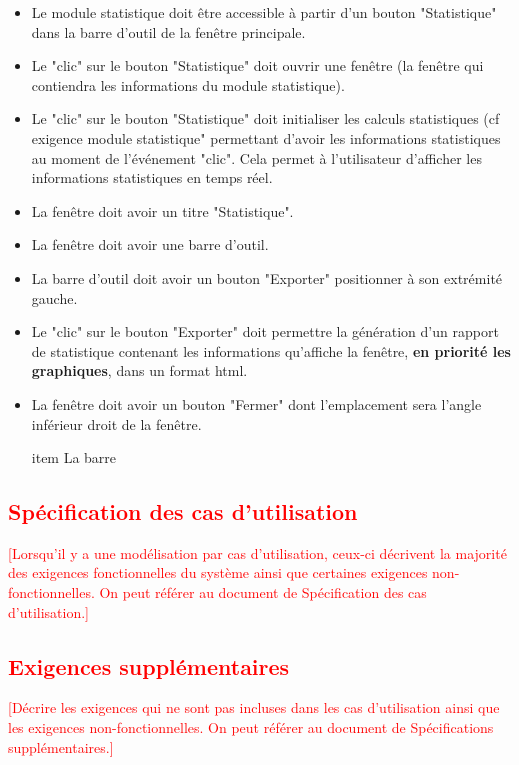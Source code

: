 \documentclass[10pt,a4paper]{report}
\begin{document}
		\begin{itemize}[label = $\triangleright$]

			\item Le module statistique doit être accessible à partir d'un bouton "Statistique" dans la barre d'outil de la fenêtre principale.

			\item Le "clic" sur le bouton "Statistique" doit ouvrir une fenêtre (la fenêtre qui contiendra les informations du module statistique).

			\item Le "clic" sur le bouton "Statistique" doit initialiser les calculs statistiques (cf exigence module statistique" permettant d'avoir les informations statistiques au moment de l'événement "clic". Cela permet à l'utilisateur d'afficher les informations statistiques en temps réel.

			\item La fenêtre doit avoir un titre "Statistique".

			\item La fenêtre doit avoir une barre d'outil.
	
			\item La barre d'outil doit avoir un bouton "Exporter" positionner à son extrémité gauche.

			\item Le "clic" sur le bouton "Exporter" doit permettre la génération d'un rapport de statistique contenant les informations qu'affiche la fenêtre, \textbf{en priorité les graphiques}, dans un format html.

			\item La fenêtre doit avoir un bouton "Fermer" dont l'emplacement sera l'angle inférieur droit de la fenêtre. 

			item La barre
		\end{itemize}
	

\textcolor{red}{\subsection{Spécification des cas d’utilisation}
[Lorsqu’il y a une modélisation par cas d’utilisation, ceux-ci décrivent la majorité des exigences fonctionnelles du système ainsi que certaines exigences non-fonctionnelles. On peut référer au document de Spécification des cas d’utilisation.]}

\textcolor{red}{\subsection{Exigences supplémentaires}
[Décrire les exigences qui ne sont pas incluses dans les cas d’utilisation ainsi que les exigences non-fonctionnelles. On peut référer au document de Spécifications supplémentaires.]}
\end{document}
